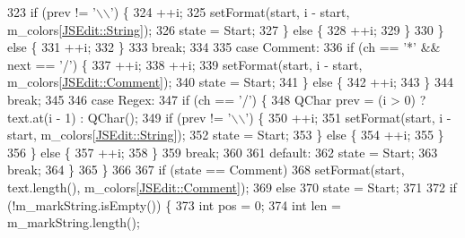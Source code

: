 \begin{DoxyCode}
323                 \textcolor{keywordflow}{if} (prev != \textcolor{charliteral}{'\(\backslash\)\(\backslash\)'}) \{
324                     ++i;
325                     setFormat(start, i - start, m\_colors[\hyperlink{class_j_s_edit_a5a465193a1344e5be9b04f5ff7883213a60b69a2cc0268b2048fceadf7067e231}{JSEdit::String}]);
326                     state = Start;
327                 \} \textcolor{keywordflow}{else} \{
328                     ++i;
329                 \}
330             \} \textcolor{keywordflow}{else} \{
331                 ++i;
332             \}
333             \textcolor{keywordflow}{break};
334 
335         \textcolor{keywordflow}{case} Comment:
336             \textcolor{keywordflow}{if} (ch == \textcolor{charliteral}{'*'} && next == \textcolor{charliteral}{'/'}) \{
337                 ++i;
338                 ++i;
339                 setFormat(start, i - start, m\_colors[\hyperlink{class_j_s_edit_a5a465193a1344e5be9b04f5ff7883213a430947e4b883553d04f618a799095f4d}{JSEdit::Comment}]);
340                 state = Start;
341             \} \textcolor{keywordflow}{else} \{
342                 ++i;
343             \}
344             \textcolor{keywordflow}{break};
345 
346         \textcolor{keywordflow}{case} Regex:
347             \textcolor{keywordflow}{if} (ch == \textcolor{charliteral}{'/'}) \{
348                 QChar prev = (i > 0) ? text.at(i - 1) : QChar();
349                 \textcolor{keywordflow}{if} (prev != \textcolor{charliteral}{'\(\backslash\)\(\backslash\)'}) \{
350                     ++i;
351                     setFormat(start, i - start, m\_colors[\hyperlink{class_j_s_edit_a5a465193a1344e5be9b04f5ff7883213a60b69a2cc0268b2048fceadf7067e231}{JSEdit::String}]);
352                     state = Start;
353                 \} \textcolor{keywordflow}{else} \{
354                     ++i;
355                 \}
356             \} \textcolor{keywordflow}{else} \{
357                 ++i;
358             \}
359             \textcolor{keywordflow}{break};
360 
361         \textcolor{keywordflow}{default}:
362             state = Start;
363             \textcolor{keywordflow}{break};
364         \}
365     \}
366 
367     \textcolor{keywordflow}{if} (state == Comment)
368         setFormat(start, text.length(), m\_colors[\hyperlink{class_j_s_edit_a5a465193a1344e5be9b04f5ff7883213a430947e4b883553d04f618a799095f4d}{JSEdit::Comment}]);
369     \textcolor{keywordflow}{else}
370         state = Start;
371 
372     \textcolor{keywordflow}{if} (!m\_markString.isEmpty()) \{
373         \textcolor{keywordtype}{int} pos = 0;
374         \textcolor{keywordtype}{int} len = m\_markString.length();

\end{DoxyCode}
